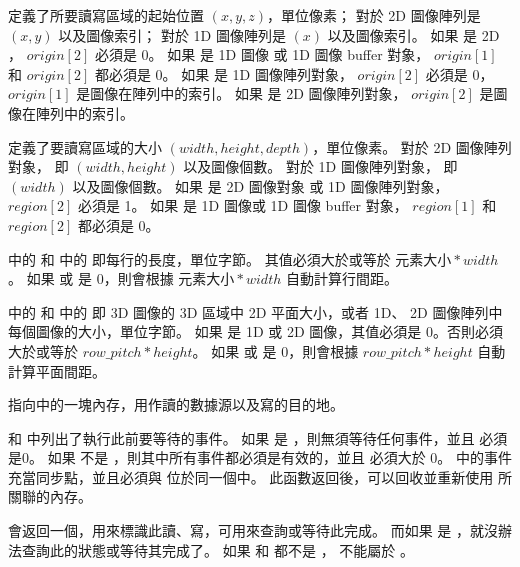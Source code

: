  定義了所要讀寫區域的起始位置 $(x, y, z)$，單位像素；
對於 2D 圖像陣列是 $(x, y)$ 以及圖像索引；
對於 1D 圖像陣列是 $(x)$ 以及圖像索引。
如果  是 2D ， $origin[2]$ 必須是 0。
如果  是 1D 圖像 或 1D 圖像 buffer 對象， $origin[1]$ 和 $origin[2]$ 都必須是 0。
如果  是 1D 圖像陣列對象， $origin[2]$ 必須是 0， $origin[1]$ 是圖像在陣列中的索引。
如果  是 2D 圖像陣列對象， $origin[2]$ 是圖像在陣列中的索引。

 定義了要讀寫區域的大小 $(width, height, depth)$，單位像素。
對於 2D 圖像陣列對象， 即 $(width, height)$ 以及圖像個數。
對於 1D 圖像陣列對象， 即 $(width)$ 以及圖像個數。
如果  是 2D 圖像對象 或 1D 圖像陣列對象， $region[2]$ 必須是 1。
如果  是 1D 圖像或 1D 圖像 buffer 對象， $region[1]$ 和 $region[2]$ 都必須是 0。

 中的  和  中的  即每行的長度，單位字節。
其值必須大於或等於 $元素大小 * width$。
如果  或  是 0，則會根據 $元素大小 * width$ 自動計算行間距。

 中的  和  中的  
即 3D 圖像的 3D 區域中 2D 平面大小，或者 1D、 2D 圖像陣列中每個圖像的大小，單位字節。
如果  是 1D 或 2D 圖像，其值必須是 0。否則必須大於或等於 $row\_pitch * height$。
如果  或  是 0，則會根據 $row\_pitch * height$ 自動計算平面間距。

 指向中的一塊內存，用作讀的數據源以及寫的目的地。

 和  中列出了執行此前要等待的事件。
如果  是 ，則無須等待任何事件，並且  必須是0。
如果  不是 ，則其中所有事件都必須是有效的，並且  必須大於 0。
 中的事件充當同步點，並且必須與  位於同一個中。
此函數返回後，可以回收並重新使用  所關聯的內存。

 會返回一個，用來標識此讀、寫，可用來查詢或等待此完成。
而如果  是 ，就沒辦法查詢此的狀態或等待其完成了。
如果  和  都不是 ，  不能屬於 。


